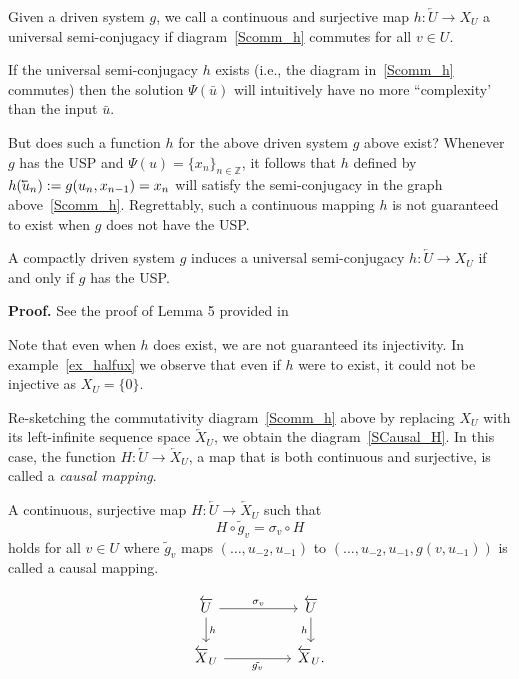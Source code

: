   \begin{Definition}
    \label{Def_UnivSemiConj} \rm
    Given a driven system $g$, we  call a continuous and surjective map $h : \overleftarrow{U} \to X_U$ a universal semi-conjugacy if  diagram~\ref{Scomm_h} commutes for all $v \in U$.
  \end{Definition}

  If the universal semi-conjugacy $h$ exists (i.e., the diagram in~\ref{Scomm_h} commutes) then the solution $\Psi(\bar{u})$ will intuitively have no more ``complexity' than the input $\bar{u}$.

But does such a function $h$ for the above driven system $g$ above exist? Whenever $g$ has the USP and $\Psi(u)={\{x_n\}}_{n\in\mathbb{Z}}$, it follows that $h$ defined by  $h(\cev{u}_n):=g(u_n,x_{n-1})=x_n$ will satisfy the semi-conjugacy in the graph above~\ref{Scomm_h}.
Regrettably, such a continuous mapping $h$ is not guaranteed to exist when $g$ does not have the USP.

\begin{Theorem}
  A compactly driven system $g$ induces a universal semi-conjugacy $h:\overleftarrow{U}\to{X_U}$ if and only if $g$ has the USP. 
\end{Theorem}
\vspace{-6mm}
{\bf Proof.} See the proof of Lemma 5 provided in~\cite{Manju_Nonlinearity}

Note that even when $h$ does exist, we are not guaranteed its injectivity. In example~\ref{ex_halfux} we observe that even if $h$ were to exist, it could not be injective as $X_U=\{0\}$.

Re-sketching the commutativity diagram~\ref{Scomm_h} above by replacing $X_U$ with its left-infinite sequence space $\overleftarrow{X}_U$, we obtain the diagram~\ref{SCausal_H}. 
In this case, the function $H:\overleftarrow{U}\to\overleftarrow{X}_U$, a map that is both continuous and surjective, is called a \emph{causal mapping}. 

\begin{Definition}
  \label{Def_CausMap}
  A continuous, surjective map $H:\overleftarrow{U}\to\overleftarrow{X}_U$ such that \[H\circ\tilde{g}_v=\sigma_v \circ{H}\] holds for all $v \in U$ where $\tilde{g}_v$ maps $(\ldots, u_{-2}, u_{-1})$ to $(\ldots, u_{-2}, u_{-1}, g(v, u_{-1}))$ is called a causal mapping.
\end{Definition}

  \begin{equation}\label{SCausal_H}
    \begin{tikzcd}
    \overleftarrow{U} && \overleftarrow{U}\\
     \overleftarrow{X}_U && \overleftarrow{X}_U.
     \\
    \arrow["{\sigma_v}", from=1-1, to=1-3]
	\arrow["h"', from=1-3, to=2-3]
	\arrow["h", from=1-1, to=2-1]
	\arrow["{\tilde{g_v}}"', from=2-1, to=2-3]
\end{tikzcd}
\end{equation}

